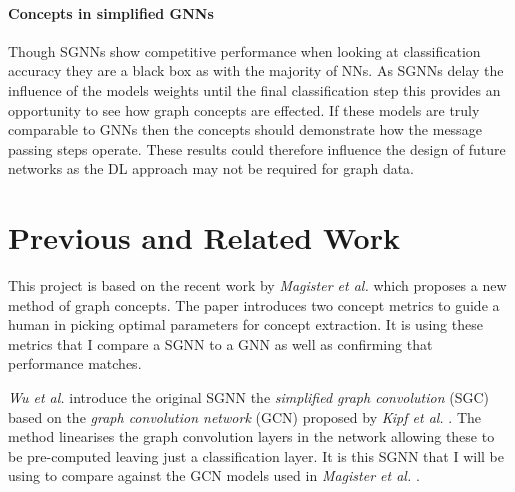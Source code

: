 \paragraph{Concepts in simplified GNNs}
Though SGNNs show competitive performance when looking at classification accuracy they are a black box as with the majority of NNs.
As SGNNs delay the influence of the models weights until the final classification step this provides an opportunity to see how graph concepts are effected.
If these models are truly comparable to GNNs then the concepts should demonstrate how the message passing steps operate.
These results could therefore influence the design of future networks as the DL approach may not be required for graph data. 



\section{Previous and Related Work}







This project is based on the recent work by \textit{Magister et al.} \cite{magister2021gcexplainer} which proposes a new method of graph concepts.
The paper introduces two concept metrics to guide a human in picking optimal parameters for concept extraction.
It is using these metrics that I compare a SGNN to a GNN as well as confirming that performance matches.




\textit{Wu et al.} \cite{wu2019simplifying} introduce the original SGNN the \emph{simplified graph convolution} (SGC) based on the \emph{graph convolution network} (GCN) proposed by \textit{Kipf et al.} \cite{kipf2016semi}.
The method linearises the graph convolution layers in the network allowing these to be pre-computed leaving just a classification layer.
It is this SGNN that I will be using to compare against the GCN models used in \textit{Magister et al.} \cite{magister2021gcexplainer}.

